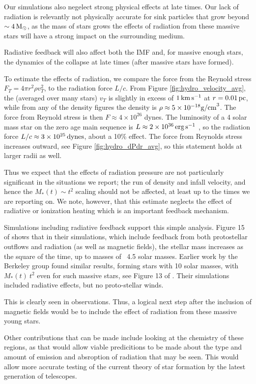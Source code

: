 \documentclass[../dissertation.tex]{subfiles}
\begin{document}
Our simulations also negelect strong physical effects at late times. 
Our lack of radiation is relevantly not physically accurate for sink particles that grow beyond $\sim 4 {\,\rm M}_\odot$, 
as the mass of stars grows the effects of radiation from these massive stars will have a strong impact on the surrounding medium. 

Radiative feedback will also affect both the IMF and, for massive enough stars, the dynamics of the collapse at late times (after massive stars have formed). 

To estimate the effects of radiation, we compare the force from the Reynold stress $F_T=4\pi r^2 \rho v_T^2$, to the radiation force $L/c$. 
From Figure \ref{fig:hydro_velocity_avg}, the (averaged over many stars) $v_T$ is slightly in excess of $1\,\rm km\,s^{-1}$ at $r=0.01\,\rm pc$, while from any of the density figures the density is $\rho\approx5\times10^{-18} {\rm g/cm}^3$. The force from Reynold stress is then $F\approx4\times 10^{26}$ dynes. The luminosity of a 4 solar mass star on the zero age main sequence is $L\approx 2\times10^{36}\,\rm erg\, s^{-1}$ \citep{1992A&AS...96..269S}, so the radiation force $L/c \approx 3\times10^{25}\,{\rm dynes}$, about a 10\% effect.  The force from Reynolds stress increases outward, see Figure \ref{fig:hydro_dPdr_avg}, so this statement holds at larger radii as well. 

Thus we expect that the effects of radiation pressure are not particularly significant in the situations we report;  the run of density and infall velocity, and hence the $M_*(t)\sim t^2$ scaling should not be affected, at least up to the times we are reporting on.  We note, however, that this estimate neglects the effect of radiative or ionization heating which is an important feedback mechanism.

Simulations including radiative feedback support this simple analysis. Figure 15 of  \citet{2014MNRAS.439.3420M} shows that in their simulations, which include feedback from both protostellar outflows and radiation (as well as magnetic fields), the stellar mass increases as the square of the time, up to masses of ~4.5 solar masses. Earlier work by the Berkeley group found similar results, forming stars with 10 solar masses, with $M_*(t)~ t^2$ even for such massive stars, see Figure 13 of \citet{2012ApJ...754...71K}. Their simulations included radiative effects, but no proto-stellar winds. 


This is clearly seen in observations. Thus, a logical next step after the inclusion of magnetic fields would be to include the effect of radiation from these massive young stars. 

Other contributions that can be made include looking at the chemistry of these regions, as that would allow viable predicitions to be made about the type and amount of emission and absroption of radiation that may be seen. 
This would allow more accurate testing of the current theory of star formation by the latest generation of telescopes.
\end{document}
